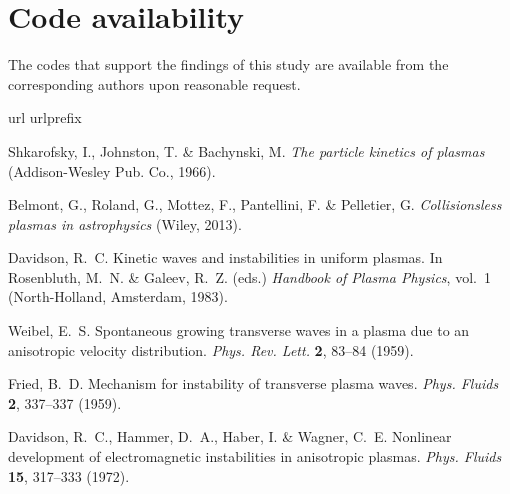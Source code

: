 \documentclass[aps,showpacs,superscriptaddress]{revtex4}
\begin{document}
\section*{Code availability}
The codes that support the findings of this study are available from the corresponding authors upon reasonable request.

%
%
\begin{thebibliography}{10}
\expandafter\ifx\csname url\endcsname\relax
  \def\url#1{\texttt{#1}}\fi
\expandafter\ifx\csname urlprefix\endcsname\relax\def\urlprefix{URL }\fi
\providecommand{\bibinfo}[2]{#2}
\providecommand{\eprint}[2][]{\url{#2}}

\bibinfo{author}{Shkarofsky, I.}, \bibinfo{author}{Johnston, T.} \&
  \bibinfo{author}{Bachynski, M.}
\newblock \emph{\bibinfo{title}{The particle kinetics of plasmas}}
  (\bibinfo{publisher}{Addison-Wesley Pub. Co.}, \bibinfo{year}{1966}).

\bibinfo{author}{{Belmont}, G.}, \bibinfo{author}{Roland, G.},
  \bibinfo{author}{Mottez, F.}, \bibinfo{author}{Pantellini, F.} \&
  \bibinfo{author}{Pelletier, G.}
\newblock \emph{\bibinfo{title}{{Collisionsless plasmas in astrophysics}}}
  (\bibinfo{publisher}{Wiley}, \bibinfo{year}{2013}).

\bibinfo{author}{Davidson, R.~C.}
\newblock \bibinfo{title}{Kinetic waves and instabilities in uniform plasmas}.
\newblock In \bibinfo{editor}{Rosenbluth, M.~N.} \& \bibinfo{editor}{Galeev, R.~Z.} (eds.) \emph{\bibinfo{booktitle}{{Handbook of Plasma Physics}}},
  vol.~\bibinfo{volume}{1} (\bibinfo{publisher}{North-Holland},
  \bibinfo{address}{Amsterdam}, \bibinfo{year}{1983}).

\bibinfo{author}{Weibel, E.~S.}
\newblock \bibinfo{title}{Spontaneous growing transverse waves in a plasma due to an anisotropic velocity distribution}.
\newblock \emph{\bibinfo{journal}{Phys. Rev. Lett.}}
  \textbf{\bibinfo{volume}{2}}, \bibinfo{pages}{83--84} (\bibinfo{year}{1959}).

\bibinfo{author}{Fried, B.~D.}
\newblock \bibinfo{title}{Mechanism for instability of transverse plasma waves}.
\newblock \emph{\bibinfo{journal}{Phys. Fluids}} \textbf{\bibinfo{volume}{2}},
  \bibinfo{pages}{337--337} (\bibinfo{year}{1959}).

\bibinfo{author}{Davidson, R.~C.}, \bibinfo{author}{Hammer, D.~A.},
  \bibinfo{author}{Haber, I.} \& \bibinfo{author}{Wagner, C.~E.}
\newblock \bibinfo{title}{Nonlinear development of electromagnetic instabilities in anisotropic plasmas}.
\newblock \emph{\bibinfo{journal}{Phys. Fluids}} \textbf{\bibinfo{volume}{15}},
  \bibinfo{pages}{317--333} (\bibinfo{year}{1972}).


\end{thebibliography}
\end{document}
